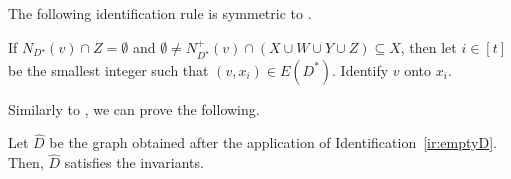 The following identification rule is symmetric to .

\begin{identification rule}\label{ir:emptyD}
If $N_{D^{\star}}(v) \cap Z=\emptyset$ and $\emptyset \neq N_{D^{\star}}^+(v) \cap (X \cup W \cup Y \cup Z) \subseteq X$, then 
let $i \in [t]$ be the smallest integer such that $(v,x_i) \in E(D^*)$.
Identify $v$ onto $x_{i}$.
\end{identification rule}

Similarly to , we can prove the following.

\begin{lemma}\label{lem:iremptyD-safe}
Let $\widehat{D}$ be the graph obtained after the application of Identification~\ref{ir:emptyD}. Then, $\widehat{D}$ satisfies the invariants.
\end{lemma}

